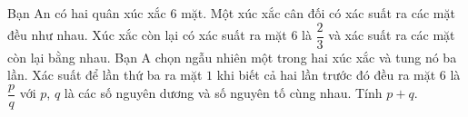 \begin{bt}%
	Bạn An có hai quân xúc xắc $6$ mặt. Một xúc xắc cân đối có xác suất ra các mặt đều như nhau. Xúc xắc còn lại có xác suất ra mặt $6$ là $\dfrac{2}{3}$ và xác suất ra các mặt còn lại bằng nhau. Bạn A chọn ngẫu nhiên một trong hai xúc xắc và tung nó ba lần. Xác suất để lần thứ ba ra mặt $1$ khi biết cả hai lần trước đó đều ra mặt $6$ là $\dfrac{p}{q}$ với $p$, $q$ là các số nguyên dương và  số nguyên tố cùng nhau. Tính $p+q$.
\end{bt}

